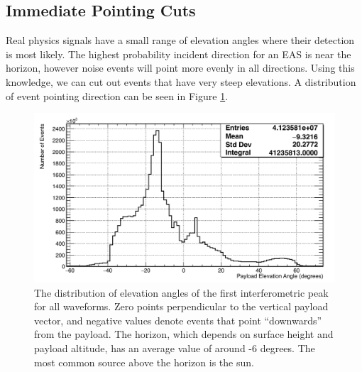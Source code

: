 	\subsection{Immediate Pointing Cuts}
		Real physics signals have a small range of elevation angles where their detection is most likely.  The highest probability incident direction for an EAS is near the horizon, however noise events will point more evenly in all directions.  Using this knowledge, we can cut out events that have very steep elevations.  A distribution of event pointing direction can be seen in Figure \ref{fig:elevationAngle}.

\begin{figure}
	\centering
	\includegraphics[width=\textwidth]{figures/elevationAngle}
	\caption{The distribution of elevation angles of the first interferometric peak for all waveforms.  Zero points perpendicular to the vertical payload vector, and negative values denote events that point ``downwards'' from the payload.  The horizon, which depends on surface height and payload altitude, has an average value of around -6 degrees.  The most common source above the horizon is the sun.} 
	\label{fig:elevationAngle}
\end{figure}	 
		


